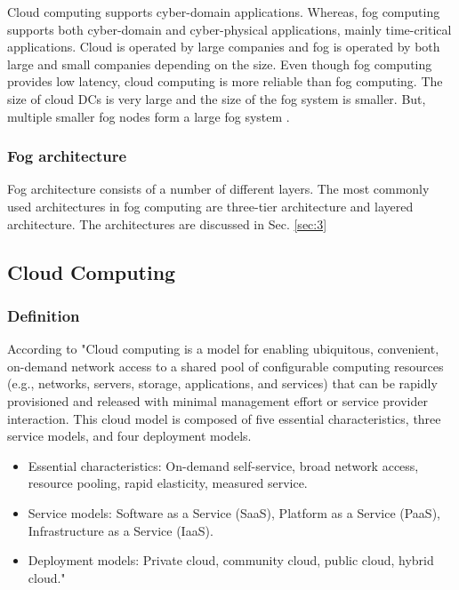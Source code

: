 \begin{center}
\begin{longtable}{|l|l|l|}
\end{longtable}
\end{center}

Cloud computing supports cyber-domain applications. Whereas, fog computing supports both cyber-domain and cyber-physical applications, mainly time-critical applications.  Cloud is operated by large companies and fog is operated by both large and small companies depending on the size. Even though fog computing provides low latency, cloud computing is more reliable than fog computing. The size of cloud DCs is very large and the size of the fog system is smaller. But, multiple smaller fog nodes form a large fog system \cite{mukherjee2018survey}.


\subsubsection{Fog architecture}

Fog architecture consists of a number of different layers. The most commonly used architectures in fog computing are three-tier architecture and layered architecture. The architectures are discussed in Sec. \ref{sec:3}


\subsection{Cloud Computing}


\subsubsection{Definition}

According to \cite{mell2011nist} "Cloud computing is a model for enabling ubiquitous, convenient, on-demand network access to a shared pool of configurable computing resources (e.g., networks, servers, storage, applications, and services) that can be rapidly provisioned and released with minimal management effort or service provider interaction. This cloud model is composed of five essential characteristics, three service models, and four deployment models.

\begin{itemize}
    \item Essential characteristics: On-demand self-service, broad network access, resource pooling, rapid elasticity, measured service.
    \item Service models: Software as a Service (SaaS), Platform as a Service (PaaS), Infrastructure as a Service (IaaS).
    \item Deployment models: Private cloud, community cloud, public cloud, hybrid cloud."
\end{itemize}

